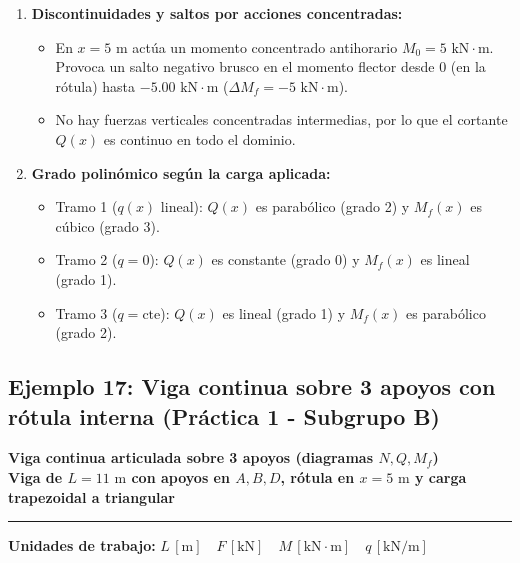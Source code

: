 {\begin{enumerate}
        \item \textbf{Discontinuidades y saltos por acciones concentradas:}
              \begin{itemize}
                  \item En $x = 5\text{ m}$ actúa un momento concentrado antihorario $M_0 = 5\text{ kN}\cdot\text{m}$. Provoca un salto negativo brusco en el momento flector desde $0$ (en la rótula) hasta $-5.00\text{ kN}\cdot\text{m}$ ($\Delta M_f = -5\text{ kN}\cdot\text{m}$).
                  \item No hay fuerzas verticales concentradas intermedias, por lo que el cortante $Q(x)$ es continuo en todo el dominio.
              \end{itemize}

        \item \textbf{Grado polinómico según la carga aplicada:}
              \begin{itemize}
                  \item Tramo 1 ($q(x)$ lineal): $Q(x)$ es parabólico (grado 2) y $M_f(x)$ es cúbico (grado 3).
                  \item Tramo 2 ($q = 0$): $Q(x)$ es constante (grado 0) y $M_f(x)$ es lineal (grado 1).
                  \item Tramo 3 ($q = \text{cte}$): $Q(x)$ es lineal (grado 1) y $M_f(x)$ es parabólico (grado 2).
              \end{itemize}
    \end{enumerate}
}

\subsection{Ejemplo 17: Viga continua sobre 3 apoyos con rótula interna (Práctica 1 - Subgrupo B)}

\begin{tcolorbox}[colback=blue!3!white, colframe=blue!40!black, arc=3pt, boxrule=0.8pt, left=8pt, right=8pt, top=6pt, bottom=6pt]
    \centering
    {\Large\bfseries\color{blue!60!black} Viga continua articulada sobre 3 apoyos (diagramas $N, Q, M_f$)}\\[2pt]
    {\normalsize\bfseries Viga de $L = 11\text{ m}$ con apoyos en $A, B, D$, rótula en $x=5\text{ m}$ y carga trapezoidal a triangular}

    \vspace{4pt}\hrule\vspace{4pt}
    {\small\textbf{Unidades de trabajo:} $L\,[\text{m}] \quad F\,[\text{kN}] \quad M\,[\text{kN}\cdot\text{m}] \quad q\,[\text{kN/m}]$}
\end{tcolorbox}

